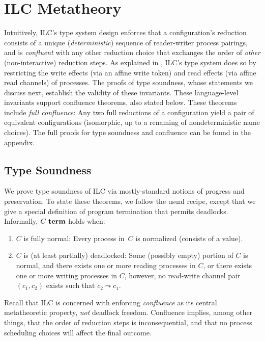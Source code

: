 \section{ILC Metatheory}
\label{sec:metatheory}


Intuitively, ILC's type system design enforces that a
configuration's reduction consists of a unique
(\emph{deterministic}) sequence of reader-writer process pairings,
and is \emph{confluent} with any other reduction choice that exchanges 
the order of \emph{other} (non-interactive) reduction steps.
%
As explained in , ILC's type system does so by restricting the
write effects (via an affine write token) and read effects (via affine read
channels) of processes.
%
The proofs of type soundness, whose statements we discuss next, 
establish the validity of these invariants.
%
These language-level invariants support confluence theorems, also
stated below.
%
These theorems include \emph{full confluence}:
Any two full reductions of a configuration yield a pair of equivalent configurations
(isomorphic, up to a renaming of nondeterministic name choices).
%
The full proofs for type soundness and confluence can be found in the appendix.

\subsection{Type Soundness}

We prove type soundness of ILC via mostly-standard notions of progress
and preservation.
%
To state these theorems, we follow the usual recipe, except that we give a
special definition of program termination that permits deadlocks.
%
Informally, $C~\textbf{term}$ holds when:
\begin{enumerate}
 \item $C$ is fully normal: Every process in~$C$ is normalized (consists of a
   value).
 \item $C$ is (at least partially) deadlocked: 
   Some (possibly empty) portion of $C$ is normal, and there exists one or more
   reading processes in $C$, or there exists one or more writing processes in
   $C$, however, no read-write channel pair~$(c_1,c_2)$ exists such that $c_2 \leadsto
   c_1$.
\end{enumerate}

Recall that ILC is concerned with enforcing \emph{confluence} as its central
metatheoretic property, \emph{not} deadlock freedom.
%
Confluence implies, among other things, that the order of reduction steps is
inconsequential, and that no process scheduling choices will affect
the final outcome.~
%

